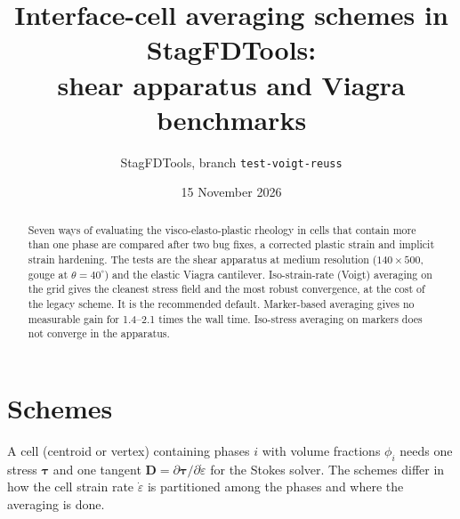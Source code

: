 \documentclass[11pt,a4paper]{article}
\title{Interface-cell averaging schemes in StagFDTools:\\ shear apparatus and Viagra benchmarks}
\author{StagFDTools, branch \texttt{test-voigt-reuss}}
\date{15 November 2026}
\newcommand{\epsd}{\dot{\varepsilon}}
\begin{document}
\maketitle

\begin{abstract}
Seven ways of evaluating the visco-elasto-plastic rheology in cells that contain more than one phase are compared after two bug fixes, a corrected plastic strain and implicit strain hardening. The tests are the shear apparatus at medium resolution ($140\times500$, gouge at $\theta=40^\circ$) and the elastic Viagra cantilever. Iso-strain-rate (Voigt) averaging on the grid gives the cleanest stress field and the most robust convergence, at the cost of the legacy scheme. It is the recommended default. Marker-based averaging gives no measurable gain for 1.4--2.1 times the wall time. Iso-stress averaging on markers does not converge in the apparatus.
\end{abstract}

\section{Schemes}

A cell (centroid or vertex) containing phases $i$ with volume fractions $\phi_i$ needs one stress $\boldsymbol\tau$ and one tangent $\mathbf D = \partial\boldsymbol\tau/\partial\epsd$ for the Stokes solver. The schemes differ in how the cell strain rate $\epsd$ is partitioned among the phases and where the averaging is done.
\end{document}

